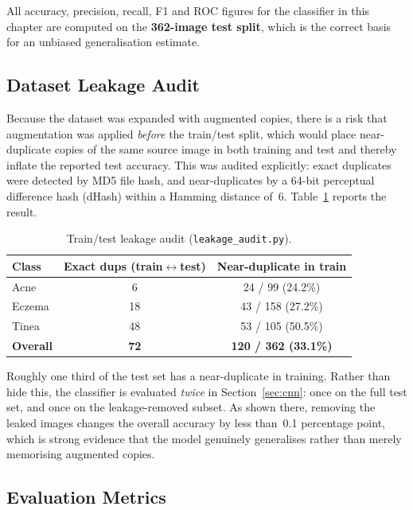 \noindent All accuracy, precision, recall, F1 and ROC figures for the classifier
in this chapter are computed on the \textbf{362-image test split}, which is the
correct basis for an unbiased generalisation estimate.

\subsection{Dataset Leakage Audit}

Because the dataset was expanded with augmented copies, there is a risk that
augmentation was applied \emph{before} the train/test split, which would place
near-duplicate copies of the same source image in both training and test and
thereby inflate the reported test accuracy. This was audited explicitly: exact
duplicates were detected by MD5 file hash, and near-duplicates by a 64-bit
perceptual difference hash (dHash) within a Hamming distance of~6.
Table~\ref{tab:leakage} reports the result.

\begin{table}[H]
\centering
\caption{Train/test leakage audit (\texttt{leakage\_audit.py}).}
\label{tab:leakage}
\begin{tabular}{|l|c|c|}
\hline
\textbf{Class} & \textbf{Exact dups (train$\leftrightarrow$test)} & \textbf{Near-duplicate in train} \\ \hline
Acne   &  6 & 24 / 99  \;(24.2\%) \\ \hline
Eczema & 18 & 43 / 158 \;(27.2\%) \\ \hline
Tinea  & 48 & 53 / 105 \;(50.5\%) \\ \hline
\textbf{Overall} & \textbf{72} & \textbf{120 / 362 \;(33.1\%)} \\ \hline
\end{tabular}
\end{table}

\noindent Roughly one third of the test set has a near-duplicate in training.
Rather than hide this, the classifier is evaluated \emph{twice} in
Section~\ref{sec:cnn}: once on the full test set, and once on the
leakage-removed subset. As shown there, removing the leaked images changes the
overall accuracy by less than~0.1 percentage point, which is strong evidence
that the model genuinely generalises rather than merely memorising augmented
copies.

\subsection{Evaluation Metrics}


